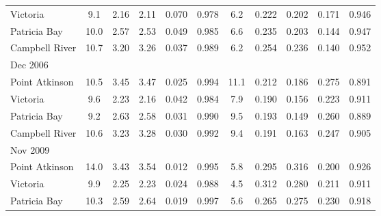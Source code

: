 \documentclass{tATO2e}
\begin{document}
\begin{table}[h]
{\begin{tabular}{|l |c c c c c | c c c c c|}
Victoria       &  9.1           &  2.16                & 2.11                 &   0.070    & 0.978  &  6.2           &  0.222                 & 0.202                  &  0.171     & 0.946 \\
Patricia Bay   & 10.0           &  2.57                & 2.53                 &   0.049    & 0.985  &  6.6           &  0.235                 & 0.203                  &  0.144     & 0.947 \\
Campbell River & 10.7           &  3.20                & 3.26                 &   0.037    & 0.989  &  6.2           &  0.254                 & 0.236                  &  0.140     & 0.952 \\
\hline
Dec 2006       &                &                      &                      &            &        &                &                        &                        &           &           \\
Point Atkinson & 10.5           &  3.45                & 3.47                 &   0.025    & 0.994  & 11.1           &  0.212                 & 0.186                  &  0.275     & 0.891 \\
Victoria       &  9.6           &  2.23                & 2.16                 &   0.042    & 0.984  &  7.9           &  0.190                 & 0.156                  &  0.223     & 0.911 \\
Patricia Bay   &  9.2           &  2.63                & 2.58                 &   0.031    & 0.990  &  9.5           &  0.193                 & 0.149                  &  0.260     & 0.889 \\
Campbell River & 10.6           &  3.23                & 3.28                 &   0.030    & 0.992  &  9.4           &  0.191                 & 0.163                  &  0.247     & 0.905 \\
\hline  
Nov 2009       &                &                      &                      &            &        &                &                        &                        &           &           \\
Point Atkinson & 14.0           &  3.43                & 3.54                 &   0.012    & 0.995  &  5.8           &  0.295                 & 0.316                  &  0.200     & 0.926 \\
Victoria       &  9.9           &  2.25                & 2.23                 &   0.024    & 0.988  &  4.5           &  0.312                 & 0.280                  &  0.211     & 0.911 \\
Patricia Bay   & 10.3           &  2.59                & 2.64                 &   0.019    & 0.997  &  5.6           &  0.265                 & 0.275                  &  0.230     & 0.918 \\

\end{tabular}}
\end{table}
\end{document}
